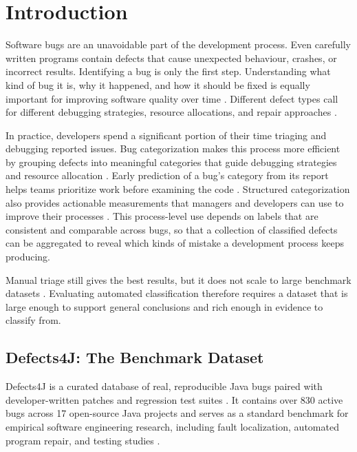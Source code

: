 \documentclass{iutbscthesis}
\begin{document}

\chapter{Introduction}

Software bugs are an unavoidable part of the development process. Even carefully written programs contain defects that cause unexpected behaviour, crashes, or incorrect results. Identifying a bug is only the first step. Understanding what kind of bug it is, why it happened, and how it should be fixed is equally important for improving software quality over time \cite{catolino2019not}. Different defect types call for different debugging strategies, resource allocations, and repair approaches \cite{catolino2019not, hirsch2022using}.

In practice, developers spend a significant portion of their time triaging and debugging reported issues. Bug categorization makes this process more efficient by grouping defects into meaningful categories that guide debugging strategies and resource allocation \cite{andrade2025empirical}. Early prediction of a bug's category from its report helps teams prioritize work before examining the code \cite{hirsch2022using}. Structured categorization also provides actionable measurements that managers and developers can use to improve their processes \cite{chillarege1992odc}. This process-level use depends on labels that are consistent and comparable across bugs, so that a collection of classified defects can be aggregated to reveal which kinds of mistake a development process keeps producing.

Manual triage still gives the best results, but it does not scale to large benchmark datasets \cite{andrade2025empirical}. Evaluating automated classification therefore requires a dataset that is large enough to support general conclusions and rich enough in evidence to classify from.

\section{Defects4J: The Benchmark Dataset}

Defects4J is a curated database of real, reproducible Java bugs paired with developer-written patches and regression test suites \cite{just2014defects4j}. It contains over 830 active bugs across 17 open-source Java projects and serves as a standard benchmark for empirical software engineering research, including fault localization, automated program repair, and testing studies \cite{rafi2024revisiting, durieux2018automatic}.
\end{document}
